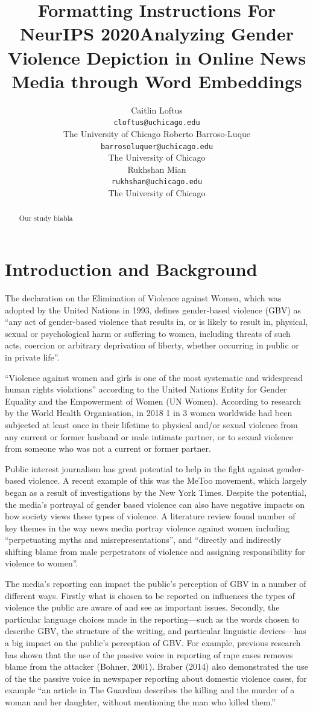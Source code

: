 \documentclass{article}
\title{Formatting Instructions For NeurIPS 2020}
\title{Analyzing Gender Violence Depiction in Online News Media through Word Embeddings}
\author{Caitlin Loftus \\
	\texttt{cloftus@uchicago.edu}  \\
	The University of Chicago
	\AND
	Roberto Barroso-Luque\\
	\texttt{barrosoluquer@uchicago.edu} \\
    The University of Chicago\\
	\AND
	Rukhshan Mian\\
	\texttt{rukhshan@uchicago.edu} \\
	The University of Chicago\\}
\begin{document}
\maketitle

\begin{abstract}{
		Our study blabla
	}
\end{abstract}

\newpage
\section{Introduction and Background}{
	
The declaration on the Elimination of Violence against Women, which was adopted by the United Nations in 1993, defines gender-based violence (GBV) as “any act of gender-based violence that results in, or is likely to result in, physical, sexual or psychological harm or suffering to women, including threats of such acts, coercion or arbitrary deprivation of liberty, whether occurring in public or in private life”. 

“Violence against women and girls is one of the most systematic and widespread human rights violations” according to the United Nations Entity for Gender Equality and the Empowerment of Women (UN Women). According to research by the World Health Organisation, in 2018 1 in 3 women worldwide had been subjected at least once in their lifetime to physical and/or sexual violence from any current or former husband or male intimate partner, or to sexual violence from someone who was not a current or former partner. 

Public  interest  journalism has great potential to help in the fight against  gender-based violence. A recent example of this was the MeToo movement, which largely began as a result of investigations by the New York Times. Despite the potential, the media’s portrayal of gender based violence can also have negative impacts on how society views these types of violence. A literature review found number of key themes in the way news media portray violence against women including “perpetuating myths and misrepresentations”, and “directly and indirectly shifting blame from male perpetrators of violence and assigning responsibility for violence to women”.

The media’s reporting can impact the public’s perception of GBV in a number of different ways. Firstly what is chosen to be reported on influences the types of violence the public are aware of and see as important issues. Secondly, the particular language choices made in the reporting—such as the words chosen to describe GBV, the structure of the writing, and particular linguistic devices—has a big impact on the public’s perception of GBV. For example, previous research has shown that the use of the passive voice in reporting of rape cases removes blame from the attacker (Bohner, 2001). Braber (2014) also demonstrated the use of the the passive voice in newspaper reporting about domestic violence cases, for example “an article in The Guardian describes the killing and the murder of a woman and her daughter, without mentioning the man who killed them.”

}
\end{document}
